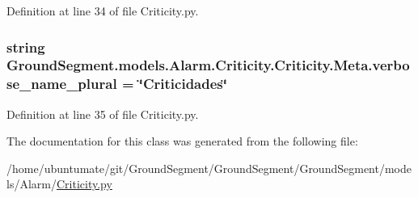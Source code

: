 Definition at line 34 of file Criticity.\+py.

\hypertarget{class_ground_segment_1_1models_1_1_alarm_1_1_criticity_1_1_criticity_1_1_meta_a27f1d87c0d59a1686bcb0026bd3bb25c}{}
\subsubsection[{verbose\+\_\+name\+\_\+plural}]{\setlength{\rightskip}{0pt plus 5cm}string Ground\+Segment.\+models.\+Alarm.\+Criticity.\+Criticity.\+Meta.\+verbose\+\_\+name\+\_\+plural = \char`\"{}Criticidades\char`\"{}\hspace{0.3cm}{\ttfamily [static]}}\label{class_ground_segment_1_1models_1_1_alarm_1_1_criticity_1_1_criticity_1_1_meta_a27f1d87c0d59a1686bcb0026bd3bb25c}


Definition at line 35 of file Criticity.\+py.



The documentation for this class was generated from the following file\+:\begin{DoxyCompactItemize}
\item 
/home/ubuntumate/git/\+Ground\+Segment/\+Ground\+Segment/\+Ground\+Segment/models/\+Alarm/\hyperlink{_criticity_8py}{Criticity.\+py}\end{DoxyCompactItemize}
